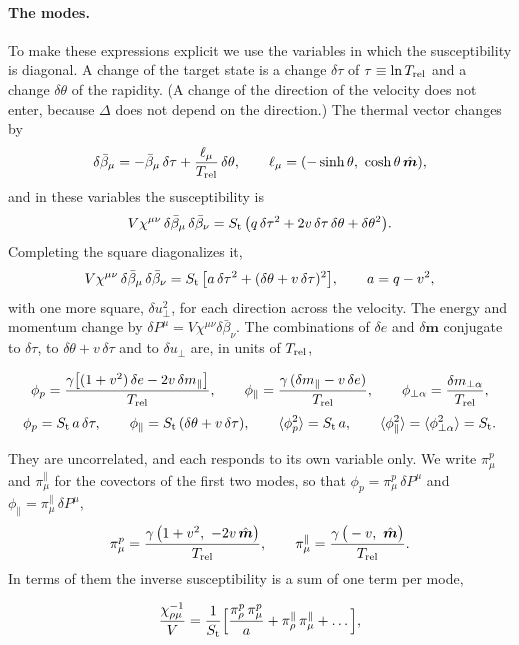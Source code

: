 \documentclass[11pt,aps,preprint,nofootinbib,superscriptaddress,tightenlines]{revtex4-2}
\newcommand{\avg}[1]{\langle #1\rangle}
\def\st{\begin{equation}}
\def\stp{\end{equation}}
\let\oldparagraph\paragraph
\renewcommand{\paragraph}{\par\bigskip\oldparagraph}
\begin{document}
\paragraph{The modes.}  To make these expressions explicit we use the variables in which the susceptibility is diagonal.  A change of the target state is a change $\delta\tau$ of $\tau\equiv\ln T_{\rm rel}$ and a change $\delta\theta$ of the rapidity.  (A change of the
direction of the velocity does not enter, because $\Delta$ does not depend on the direction.)  The thermal vector changes by
\st
\delta\bar\beta_\mu=-\bar\beta_\mu\,\delta\tau+\frac{\ell_\mu}{T_{\rm rel}}\,\delta\theta,\qquad \ell_\mu=(-\sinh\theta,\ \cosh\theta\,\hat{\bm m}) ,
\stp
and in these variables the susceptibility is
\st
V\chi^{\mu\nu}\,\delta\bar\beta_\mu\,\delta\bar\beta_\nu=S_{\rm t}\,\big(q\,\delta\tau^2+2v\,\delta\tau\,\delta\theta+\delta\theta^2\big) .
\label{quadform}
\stp
Completing the square diagonalizes it,
\st
V\chi^{\mu\nu}\,\delta\bar\beta_\mu\,\delta\bar\beta_\nu=S_{\rm t}\,\big[a\,\delta\tau^2+(\delta\theta+v\,\delta\tau)^2\big],\qquad a=q-v^2 ,
\label{diag}
\stp
with one more square, $\delta u_\perp^2$, for each direction across the velocity.  The energy and momentum change by $\delta P^\mu=V\chi^{\mu\nu}\delta\bar\beta_\nu$.  The combinations of $\delta e$ and
$\delta\bm m$ conjugate to $\delta\tau$, to $\delta\theta+v\,\delta\tau$ and to $\delta u_\perp$ are, in units of $T_{\rm rel}$,
\begin{keyeq}
\st
\phi_p=\frac{\gamma\big[(1+v^2)\,\delta e-2v\,\delta m_\parallel\big]}{T_{\rm rel}},\qquad
\phi_\parallel=\frac{\gamma\,(\delta m_\parallel-v\,\delta e)}{T_{\rm rel}},\qquad
\phi_{\perp\alpha}=\frac{\delta m_{\perp\alpha}}{T_{\rm rel}} ,
\label{modes}
\stp
\st
\phi_p=S_{\rm t}\,a\,\delta\tau,\qquad \phi_\parallel=S_{\rm t}\,(\delta\theta+v\,\delta\tau),\qquad
\avg{\phi_p^2}=S_{\rm t}\,a,\qquad \avg{\phi_\parallel^2}=\avg{\phi_{\perp\alpha}^2}=S_{\rm t} .
\label{response}
\stp
\end{keyeq}
They are uncorrelated, and each responds to its own variable only.  We write $\pi^p_\mu$ and $\pi^\parallel_\mu$ for the covectors of the first two
modes, so that $\phi_p=\pi^p_\mu\,\delta P^\mu$ and $\phi_\parallel=\pi^\parallel_\mu\,\delta P^\mu$,
\st
\pi^p_\mu=\frac{\gamma\,\big(1+v^2,\ -2v\,\hat{\bm m}\big)}{T_{\rm rel}},\qquad
\pi^\parallel_\mu=\frac{\gamma\,\big(-v,\ \hat{\bm m}\big)}{T_{\rm rel}} .
\stp
In terms of them the inverse susceptibility is a sum of one term per mode,
\begin{keyeq}
\st
\frac{\chi^{-1}_{\rho\mu}}V=\frac1{S_{\rm t}}\Big[\frac{\pi^p_\rho\,\pi^p_\mu}a+\pi^\parallel_\rho\,\pi^\parallel_\mu+\dots\Big] ,
\label{chiinv}
\stp
\end{keyeq}
\end{document}
